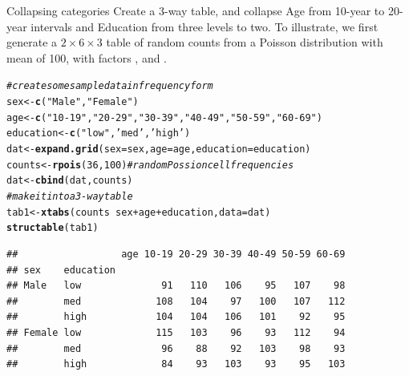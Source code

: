 \documentclass[11pt]{book}\usepackage[]{graphicx}\usepackage[]{color}
\makeatletter
\newcommand{\hlnum}[1]{\textcolor[rgb]{0.686,0.059,0.569}{#1}}%
\newcommand{\hlstr}[1]{\textcolor[rgb]{0.192,0.494,0.8}{#1}}%
\newcommand{\hlcom}[1]{\textcolor[rgb]{0.678,0.584,0.686}{\textit{#1}}}%
\newcommand{\hlopt}[1]{\textcolor[rgb]{0,0,0}{#1}}%
\newcommand{\hlstd}[1]{\textcolor[rgb]{0.345,0.345,0.345}{#1}}%
\newcommand{\hlkwb}[1]{\textcolor[rgb]{0.69,0.353,0.396}{#1}}%
\newcommand{\hlkwc}[1]{\textcolor[rgb]{0.333,0.667,0.333}{#1}}%
\newcommand{\hlkwd}[1]{\textcolor[rgb]{0.737,0.353,0.396}{\textbf{#1}}}%
\newenvironment{kframe}{%
 \def\at@end@of@kframe{}%
 \ifinner\ifhmode%
  \def\at@end@of@kframe{\end{minipage}}%
  \begin{minipage}{\columnwidth}%
 \fi\fi%
 \def\FrameCommand##1{\hskip\@totalleftmargin \hskip-\fboxsep
 \colorbox{shadecolor}{##1}\hskip-\fboxsep
     \hskip-\linewidth \hskip-\@totalleftmargin \hskip\columnwidth}%
 \MakeFramed {\advance\hsize-\width
   \@totalleftmargin\z@ \linewidth\hsize
   \@setminipage}}%
 {\par\unskip\endMakeFramed%
 \at@end@of@kframe}
\newenvironment{knitrout}{}{} %
\renewenvironment{knitrout}{\small\renewcommand{\baselinestretch}{.85}}{} %
\makeatother
\begin{document}
\begin{Example}{Collapsing categories}
Create a 3-way table, and collapse Age from 10-year to 20-year intervals
and Education from three levels to two.
To illustrate, we first generate a $2 \times 6 \times 3$ table of random counts from a 
Poisson distribution with mean of 100, with factors , 
and .
\begin{knitrout}
\color{fgcolor}\begin{kframe}
\begin{alltt}
\hlcom{# create some sample data in frequency form}
\hlstd{sex} \hlkwb{<-} \hlkwd{c}\hlstd{(}\hlstr{"Male"}\hlstd{,} \hlstr{"Female"}\hlstd{)}
\hlstd{age} \hlkwb{<-} \hlkwd{c}\hlstd{(}\hlstr{"10-19"}\hlstd{,} \hlstr{"20-29"}\hlstd{,}  \hlstr{"30-39"}\hlstd{,} \hlstr{"40-49"}\hlstd{,} \hlstr{"50-59"}\hlstd{,} \hlstr{"60-69"}\hlstd{)}
\hlstd{education} \hlkwb{<-} \hlkwd{c}\hlstd{(}\hlstr{"low"}\hlstd{,} \hlstr{'med'}\hlstd{,} \hlstr{'high'}\hlstd{)}
\hlstd{dat} \hlkwb{<-} \hlkwd{expand.grid}\hlstd{(}\hlkwc{sex}\hlstd{=sex,} \hlkwc{age}\hlstd{=age,} \hlkwc{education}\hlstd{=education)}
\hlstd{counts} \hlkwb{<-} \hlkwd{rpois}\hlstd{(}\hlnum{36}\hlstd{,} \hlnum{100}\hlstd{)}   \hlcom{# random Possion cell frequencies}
\hlstd{dat} \hlkwb{<-} \hlkwd{cbind}\hlstd{(dat, counts)}
\hlcom{# make it into a 3-way table}
\hlstd{tab1} \hlkwb{<-} \hlkwd{xtabs}\hlstd{(counts} \hlopt{~} \hlstd{sex} \hlopt{+} \hlstd{age} \hlopt{+} \hlstd{education,} \hlkwc{data}\hlstd{=dat)}
\hlkwd{structable}\hlstd{(tab1)}
\end{alltt}
\begin{verbatim}
##                  age 10-19 20-29 30-39 40-49 50-59 60-69
## sex    education                                        
## Male   low              91   110   106    95   107    98
##        med             108   104    97   100   107   112
##        high            104   104   106   101    92    95
## Female low             115   103    96    93   112    94
##        med              96    88    92   103    98    93
##        high             84    93   103    93    95   103
\end{verbatim}
\end{kframe}
\end{knitrout}


\end{Example}
\end{document}
